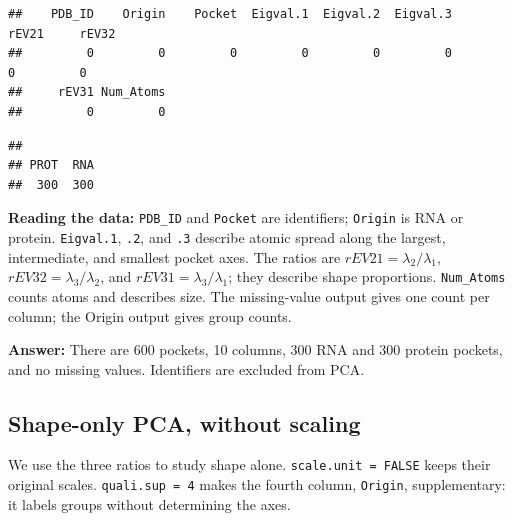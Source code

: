 \documentclass[
  10pt,
]{article}
\newenvironment{Shaded}{\begin{snugshade}}{\end{snugshade}}
\newcommand{\AttributeTok}[1]{\textcolor[rgb]{0.13,0.29,0.53}{#1}}
\newcommand{\CommentTok}[1]{\textcolor[rgb]{0.56,0.35,0.01}{\textit{#1}}}
\newcommand{\ConstantTok}[1]{\textcolor[rgb]{0.56,0.35,0.01}{#1}}
\newcommand{\DecValTok}[1]{\textcolor[rgb]{0.00,0.00,0.81}{#1}}
\newcommand{\FunctionTok}[1]{\textcolor[rgb]{0.13,0.29,0.53}{\textbf{#1}}}
\newcommand{\NormalTok}[1]{#1}
\newcommand{\OtherTok}[1]{\textcolor[rgb]{0.56,0.35,0.01}{#1}}
\newcommand{\SpecialCharTok}[1]{\textcolor[rgb]{0.81,0.36,0.00}{\textbf{#1}}}
\newcommand{\StringTok}[1]{\textcolor[rgb]{0.31,0.60,0.02}{#1}}
\begin{document}
\begin{verbatim}
##    PDB_ID    Origin    Pocket  Eigval.1  Eigval.2  Eigval.3     rEV21     rEV32 
##         0         0         0         0         0         0         0         0 
##     rEV31 Num_Atoms 
##         0         0
\end{verbatim}

\begin{Shaded}
\end{Shaded}

\begin{verbatim}
## 
## PROT  RNA 
##  300  300
\end{verbatim}

\textbf{Reading the data:} \texttt{PDB\_ID} and \texttt{Pocket} are
identifiers; \texttt{Origin} is RNA or protein. \texttt{Eigval.1},
\texttt{.2}, and \texttt{.3} describe atomic spread along the largest,
intermediate, and smallest pocket axes. The ratios are
\(rEV21=\lambda_2/\lambda_1\), \(rEV32=\lambda_3/\lambda_2\), and
\(rEV31=\lambda_3/\lambda_1\); they describe shape proportions.
\texttt{Num\_Atoms} counts atoms and describes size. The missing-value
output gives one count per column; the Origin output gives group counts.

\textbf{Answer:} There are 600 pockets, 10 columns, 300 RNA and 300
protein pockets, and no missing values. Identifiers are excluded from
PCA.

\subsection{Shape-only PCA, without
scaling}\label{shape-only-pca-without-scaling}

We use the three ratios to study shape alone.
\texttt{scale.unit\ =\ FALSE} keeps their original scales.
\texttt{quali.sup\ =\ 4} makes the fourth column, \texttt{Origin},
supplementary: it labels groups without determining the axes.

\begin{Shaded}
\end{Shaded}
\end{document}
